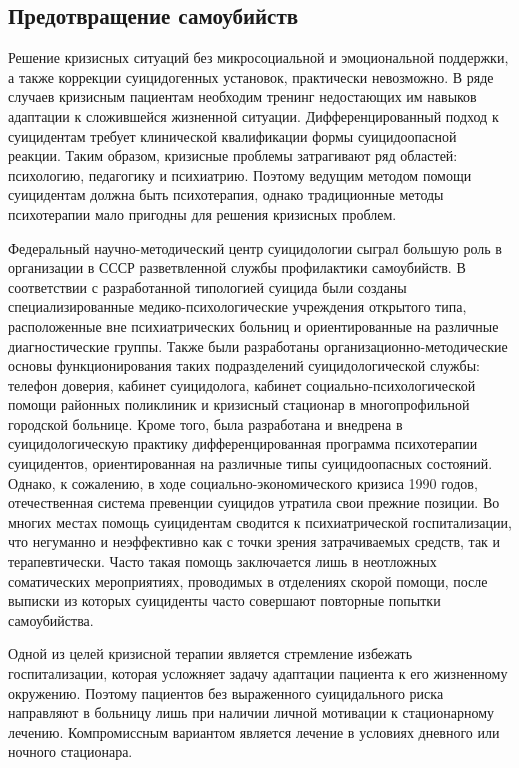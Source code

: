 \subsection{Предотвращение самоубийств}

Решение кризисных ситуаций без микросоциальной и эмоциональной поддержки, а также коррекции суицидогенных установок, практически невозможно. В ряде случаев кризисным пациентам необходим тренинг недостающих им навыков адаптации к сложившейся жизненной ситуации. Дифференцированный подход к суицидентам требует клинической квалификации формы суицидоопасной реакции. Таким образом, кризисные проблемы затрагивают ряд областей: психологию, педагогику и психиатрию. Поэтому ведущим методом помощи суицидентам должна быть психотерапия, однако традиционные методы психотерапии мало пригодны для решения кризисных проблем.~\cite{starsen}

Федеральный научно-методический центр суицидологии сыграл большую роль в организации в СССР разветвленной службы профилактики самоубийств. В соответствии с разработанной типологией суицида были созданы специализированные медико-психологические учреждения открытого типа, расположенные вне психиатрических больниц и ориентированные на различные диагностические группы. Также были разработаны организационно-методические основы функционирования таких подразделений суицидологической службы: телефон доверия, кабинет суицидолога, кабинет социально-психологической помощи районных поликлиник и кризисный стационар в многопрофильной городской больнице. Кроме того, была разработана и внедрена в суицидологическую практику дифференцированная программа психотерапии суицидентов, ориентированная на различные типы суицидоопасных состояний. Однако, к сожалению, в ходе социально-экономического кризиса 1990 годов, отечественная система превенции суицидов утратила свои прежние позиции. Во многих местах помощь суицидентам сводится к психиатрической госпитализации, что негуманно и неэффективно как с точки зрения затрачиваемых средств, так и терапевтически. Часто такая помощь заключается лишь в неотложных соматических мероприятиях, проводимых в отделениях скорой помощи, после выписки из которых суициденты часто совершают повторные попытки самоубийства.~\cite{starsen}

Одной из целей кризисной терапии является стремление избежать госпитализации, которая усложняет задачу адаптации пациента к его жизненному окружению. Поэтому пациентов без выраженного суицидального риска направляют в больницу лишь при наличии личной мотивации к стационарному лечению. Компромиссным вариантом является лечение в условиях дневного или ночного стационара.

